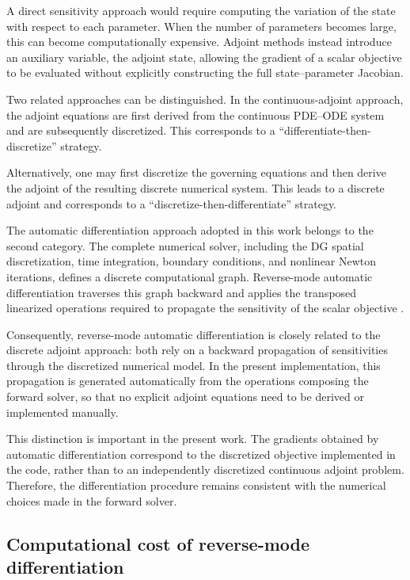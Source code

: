 \documentclass[11pt,a4paper]{report}
\theoremstyle{plain}
\theoremstyle{definition}
\begin{document}
A direct sensitivity approach would require computing the variation of the
state with respect to each parameter. When the number of parameters becomes
large, this can become computationally expensive. Adjoint methods instead
introduce an auxiliary variable, the adjoint state, allowing the gradient of
a scalar objective to be evaluated without explicitly constructing the full
state--parameter Jacobian.

Two related approaches can be distinguished. In the continuous-adjoint
approach, the adjoint equations are first derived from the continuous
PDE--ODE system and are subsequently discretized. This corresponds to a
``differentiate-then-discretize'' strategy.

Alternatively, one may first discretize the governing equations and then
derive the adjoint of the resulting discrete numerical system. This leads to
a discrete adjoint and corresponds to a
``discretize-then-differentiate'' strategy.

The automatic differentiation approach adopted in this work belongs to the
second category. The complete numerical solver, including the DG spatial
discretization, time integration, boundary conditions, and nonlinear Newton
iterations, defines a discrete computational graph. Reverse-mode automatic
differentiation traverses this graph backward and applies the transposed
linearized operations required to propagate the sensitivity of the scalar
objective \cite{griewank2008evaluating}.

Consequently, reverse-mode automatic differentiation is closely related to
the discrete adjoint approach: both rely on a backward propagation of
sensitivities through the discretized numerical model. In the present
implementation, this propagation is generated automatically from the
operations composing the forward solver, so that no explicit adjoint
equations need to be derived or implemented manually.

This distinction is important in the present work. The gradients obtained by
automatic differentiation correspond to the discretized objective
implemented in the code, rather than to an independently discretized
continuous adjoint problem. Therefore, the differentiation procedure remains
consistent with the numerical choices made in the forward solver.

\subsection{Computational cost of reverse-mode differentiation}
\label{subsec:backward_performance}
\end{document}
